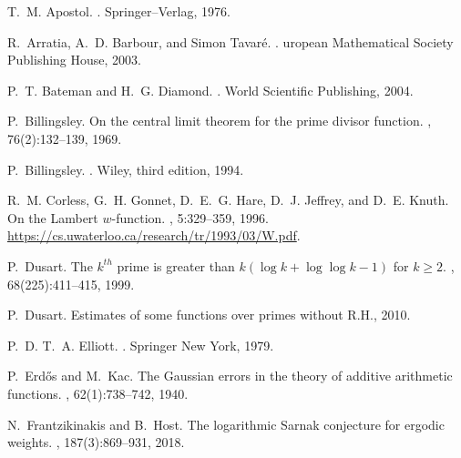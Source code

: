 \documentclass[11pt,reqno,a4letter]{article}
\numberwithin{equation}{section}
\numberwithin{figure}{section}
\numberwithin{table}{section}
\theoremstyle{plain}
\numberwithin{theorem}{section}
\theoremstyle{definition}
\theoremstyle{remark}
\begin{document}
\renewcommand{\refname}{References} 


\begin{thebibliography}{10}

T.~M. Apostol.
.
\newblock Springer--Verlag, 1976.

R.~Arratia, A.~D. Barbour, and Simon Tavar{\'{e}}.
.
uropean Mathematical Society Publishing House, 2003.

P.~T. Bateman and H.~G. Diamond.
.
\newblock World Scientific Publishing, 2004.

P.~Billingsley.
\newblock On the central limit theorem for the prime divisor function.
, 76(2):132--139, 1969.

P.~Billingsley.
.
\newblock Wiley, third edition, 1994.

R.~M. Corless, G.~H. Gonnet, D.~E.~G. Hare, D.~J. Jeffrey, and D.~E. Knuth.
\newblock On the {L}ambert $w$-function.
, 5:329--359, 1996.
\newblock \url{https://cs.uwaterloo.ca/research/tr/1993/03/W.pdf}.

P.~Dusart.
\newblock The $k^{th}$ prime is greater than $k(\log k +\log\log k-1)$ for $k
  \geq 2$.
, 68(225):411--415, 1999.

P.~Dusart.
\newblock Estimates of some functions over primes without {R}.{H}., 2010.

P.~D. T.~A. Elliott.
.
\newblock Springer New York, 1979.

P.~Erd{\H{o}}s and M.~Kac.
\newblock The {G}aussian errors in the theory of additive arithmetic functions.
, 62(1):738--742, 1940.

N.~Frantzikinakis and B.~Host.
\newblock The logarithmic {S}arnak conjecture for ergodic weights.
, 187(3):869--931, 2018.


\end{thebibliography}
\end{document}
